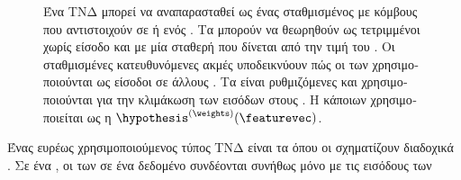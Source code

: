 {{\begin{figure}[H]
 		{
		\caption{\foreignlanguage{greek}{Ένα ΤΝΔ μπορεί να αναπαρασταθεί ως ένας σταθμισμένος}  
			\foreignlanguage{greek}{με κόμβους που αντιστοιχούν σε}  \foreignlanguage{greek}{ή}  
			\foreignlanguage{greek}{ενός} . \foreignlanguage{greek}{Τα}  \foreignlanguage{greek}{μπορούν 
			να θεωρηθούν ως τετριμμένοι}  \foreignlanguage{greek}{χωρίς είσοδο και με μία σταθερή}  
			\foreignlanguage{greek}{που δίνεται από την τιμή} \foreignlanguage{greek}{του} . \foreignlanguage{greek}{Οι 
			σταθμισμένες κατευθυνόμενες ακμές υποδεικνύουν πώς οι}  \foreignlanguage{greek}{των}  
			\foreignlanguage{greek}{χρησιμοποιούνται ως είσοδοι σε άλλους} . \foreignlanguage{greek}{Τα} 
			 \foreignlanguage{greek}{είναι ρυθμιζόμενες}  \foreignlanguage{greek}{και 
			χρησιμοποιούνται για την κλιμάκωση των εισόδων στους} . \foreignlanguage{greek}{Η}  
			\foreignlanguage{greek}{κάποιων}  \foreignlanguage{greek}{χρησιμοποιείται ως η}  
			$\hypothesis^{(\weights)}(\featurevec)$. \label{fig_ANN_DAG_dict}} }
 		\end{figure}
		\foreignlanguage{greek}{Ένας ευρέως χρησιμοποιούμενος τύπος ΤΝΔ είναι τα}  \foreignlanguage{greek}{όπου 
		οι}  \foreignlanguage{greek}{σχηματίζουν διαδοχικά} . \foreignlanguage{greek}{Σε ένα} 
		, \foreignlanguage{greek}{οι}  \foreignlanguage{greek}{των}  
		\foreignlanguage{greek}{σε ένα δεδομένο}  \foreignlanguage{greek}{συνδέονται συνήθως μόνο με τις εισόδους των} 
}}
